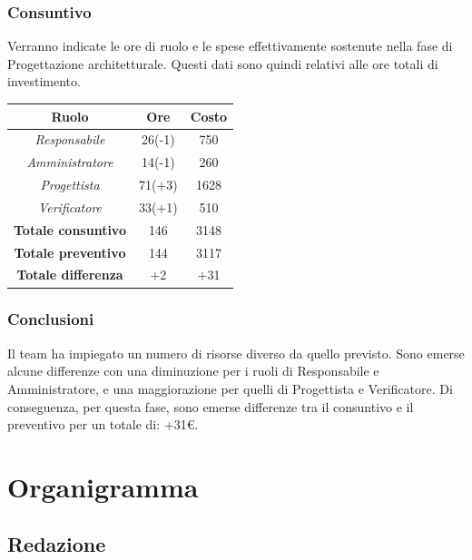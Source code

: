 \subsubsection{Consuntivo}

Verranno indicate le ore di ruolo e le spese effettivamente sostenute nella fase di Progettazione architetturale. Questi dati sono quindi relativi alle ore totali di investimento.

\begin{center}
	\centering
	\begin{tabular}{|c|c|c|}
		\hline
		\textbf{Ruolo} & \textbf{Ore} & \textbf{Costo} \\
		\hline
		\emph{Responsabile}  & 26(-1) & 750 \\
		\hline  \emph{Amministratore}  & 14(-1) & 260 \\
		\hline  \emph{Progettista}  & 71(+3) & 1628 \\
		\hline  \emph{Verificatore}  & 33(+1) & 510 \\
		\hline
		\textbf{Totale consuntivo} & 146 & 3148 \\
		\hline
		\textbf{Totale preventivo} & 144 & 3117 \\
		\hline
		\textbf{Totale differenza} & +2 & +31 \\
		\hline
	\end{tabular}
	
\end{center}

\subsubsection{Conclusioni}

Il team ha impiegato un numero di risorse diverso da quello previsto. Sono emerse alcune differenze con una diminuzione per i ruoli di Responsabile e Amministratore, e una maggiorazione per quelli di Progettista e Verificatore. Di conseguenza, per questa fase, sono emerse differenze tra il consuntivo e il preventivo per un totale di: +31€.

\clearpage

\appendix
\section{Organigramma}
\subsection{Redazione}

